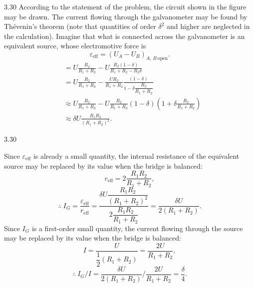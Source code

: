 \begin{solution}{3.30}
According to the statement of the problem, the circuit shown in the figure may be drawn. The current flowing through the galvanometer may be found by Th\'evenin's theorem (note that quantities of order $\delta^2$ and higher are neglected in the calculation). Imagine that what is connected across the galvanometer is an equivalent source, whose electromotive force is
\[
\varepsilon_{\text{eff}}=(U_A-U_B)_{A,\,B\ \text{open}}.
\]
\begin{align*}
&=U\frac{R_2}{R_1+R_2}-U\frac{R_2(1-\delta)}{R_1+R_2-R_2\delta}\\
&=U\frac{R_2}{R_1+R_2}-\frac{UR_2}{R_1+R_2}\frac{(1-\delta)}{1-\delta\dfrac{R_2}{R_1+R_2}}\\
&\approx U\frac{R_2}{R_1+R_2}-U\frac{R_2}{R_1+R_2}(1-\delta)
\left(1+\delta\frac{R_2}{R_1+R_2}\right)\\
&\approx\delta U\frac{R_1R_2}{(R_1+R_2)^2}.
\end{align*}

\begin{figbox}{3.30}
\end{figbox}

Since $\varepsilon_{\text{eff}}$ is already a small quantity, the internal resistance of the equivalent source may be replaced by its value when the bridge is balanced:
\[
r_{\text{eff}}=2\frac{R_1R_2}{R_1+R_2},
\]
\[
\therefore\ I_G=\frac{\varepsilon_{\text{eff}}}{r_{\text{eff}}}
=\frac{\delta U\dfrac{R_1R_2}{(R_1+R_2)^2}}{2\dfrac{R_1R_2}{R_1+R_2}}
=\frac{\delta U}{2(R_1+R_2)}.
\]
Since $I_G$ is a first-order small quantity, the current flowing through the source may be replaced by its value when the bridge is balanced:
\[
I=\frac{U}{\dfrac{1}{2}(R_1+R_2)}=\frac{2U}{R_1+R_2},
\]
\[
\therefore\ I_G/I=\frac{\delta U}{2(R_1+R_2)}\Big/\frac{2U}{R_1+R_2}=\frac{\delta}{4}.
\]
\end{solution}


